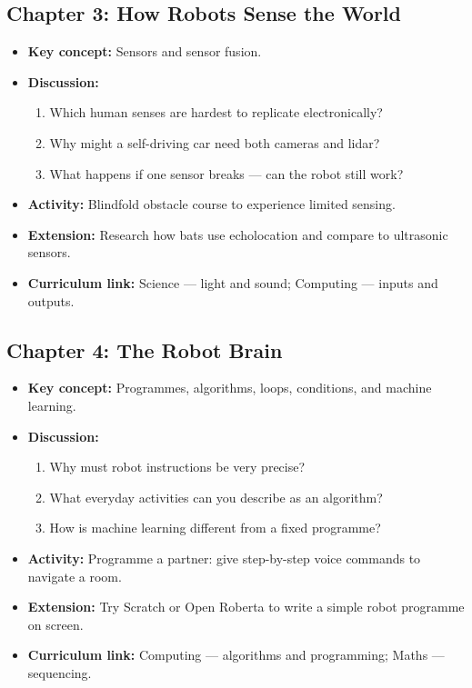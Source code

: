 \subsection*{Chapter 3: How Robots Sense the World}
\begin{itemize}
  \item \textbf{Key concept:} Sensors and sensor fusion.
  \item \textbf{Discussion:}
    \begin{enumerate}
      \item Which human senses are hardest to replicate electronically?
      \item Why might a self-driving car need both cameras and lidar?
      \item What happens if one sensor breaks --- can the robot still work?
    \end{enumerate}
  \item \textbf{Activity:} Blindfold obstacle course to experience limited sensing.
  \item \textbf{Extension:} Research how bats use echolocation and compare to ultrasonic sensors.
  \item \textbf{Curriculum link:} Science --- light and sound; Computing --- inputs and outputs.
\end{itemize}

\subsection*{Chapter 4: The Robot Brain}
\begin{itemize}
  \item \textbf{Key concept:} Programmes, algorithms, loops, conditions, and machine learning.
  \item \textbf{Discussion:}
    \begin{enumerate}
      \item Why must robot instructions be very precise?
      \item What everyday activities can you describe as an algorithm?
      \item How is machine learning different from a fixed programme?
    \end{enumerate}
  \item \textbf{Activity:} Programme a partner: give step-by-step voice commands to navigate a room.
  \item \textbf{Extension:} Try Scratch or Open Roberta to write a simple robot programme on screen.
  \item \textbf{Curriculum link:} Computing --- algorithms and programming; Maths --- sequencing.
\end{itemize}

